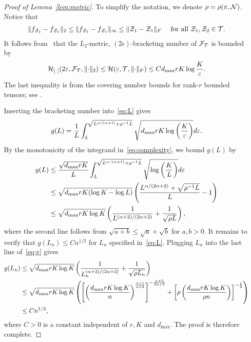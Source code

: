 \documentclass[11pt]{article}
\theoremstyle{plain}
\theoremstyle{definition}
\begin{document}
\begin{proof}[Proof of Lemma~\ref{lem:metric}]
To simplify the notation, we denote $\rho=\rho(\pi, \mathcal{N})$. 
Notice that 
\begin{align}
	\lVert f_{\mathcal{Z}_1}-f_{\mathcal{Z}_1}\rVert_2\leq\|f_{\mathcal{Z}_1}-f_{\mathcal{Z}_1}\|_\infty\leq \lVert\mathcal{Z}_1-\mathcal{Z}_1\rVert_F\quad\text{ for all } \mathcal{Z}_1,\mathcal{Z}_2\in\mathcal{T}.
\end{align}
It follows from~\citet[Theorem 9.22]{kosorok2007introduction} that the $L_2$-metric, $(2\epsilon)$-bracketing number of $\mathcal{F}_{\mathcal{T}}$ is bounded by 
\[
\mathcal{H}_{[\ ]}(2\varepsilon, \mathcal{F}_{\mathcal{T}}, \lVert\cdot\rVert_2)\leq \mathcal{H}(\varepsilon, \mathcal{T}, \lVert\cdot\rVert_F) \leq Cd_{\max}rK\log {K\over \varepsilon}.
\]
The last inequality is from the covering number bounds for rank-$r$ bounded tensors; see \citet[Lemma 3]{mu2014square}.

Inserting the bracketing number into~\eqref{eq:L} gives
\begin{equation}\label{eq:complexity}
g(L)={1\over L}\int^{\sqrt{L^{\alpha/(\alpha+1)}+{\rho^{-1}L}}}_{L}  \sqrt{d_{\max}rK\log\left({K\over \varepsilon}\right)}d\varepsilon.
\end{equation}
By the monotonicity of the integrand in~\eqref{eq:complexity}, we bound $g(L)$ by 
\begin{align}\label{eq:g}
g(L)&\leq {\sqrt{d_{\max}rK}\over L}\int_{L}^{\sqrt{L^{\alpha/(\alpha+1)}+\rho^{-1}L}}\sqrt{\log \left(K \over L \right)}d\varepsilon\notag \\
&\leq \sqrt{d_{\max}rK(\log K - \log L)}\left({L^{\alpha/(2\alpha+2)}+\sqrt{\rho^{-1}L} \over L }-1\right)\notag \\
&\leq  \sqrt{d_{\max}rK\log K}\left( {1\over L^{(\alpha+2)/(2\alpha+2)}}+{1\over \sqrt{\rho L}}\right),
\end{align}
where the second line follows from $\sqrt{a+b} \leq \sqrt{a}+\sqrt{b}$ for $a,b>0$.
It remains to verify that $g(L_n) \leq Cn^{1/2}$ for $L_n$ specified in~\eqref{eq:L}. Plugging $L_n$ into the last line of~\eqref{eq:g} gives
\begin{align}
g(L_n)&\leq \sqrt{d_{\max}rK\log K}\left( {1\over L_n^{(\alpha+2)/(2\alpha+2)}}+{1\over \sqrt{\rho L_n}}\right)
\\&\leq \sqrt{d_{\max}rK\log K}\left(\left[\left(d_{\max}rK\log K\over n\right)^{\alpha+1\over \alpha+2}\right]^{-{\alpha+2\over2\alpha+2}}+\left[\rho \left(d_{\max}rK\log K\over \rho n\right)\right]^{-{1\over2}} \right)
\\&\leq Cn^{1/2},
\end{align}
where $C>0$ is a constant independent of $r,K$  and $d_{\text{max}}$. The proof is therefore complete.  
\end{proof}
\end{document}

